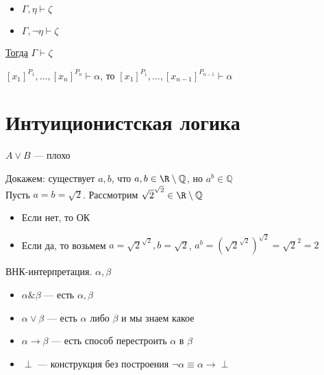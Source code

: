 \documentclass[english]{article}
\begin{document}
\begin{lemma}
	\-
	\begin{itemize}
		\item \(\Gamma, \eta \vdash \zeta\)
		\item \(\Gamma, \neg \eta \vdash \zeta\)
	\end{itemize}
	\uline{Тогда} \(\Gamma \vdash \zeta\)
	\label{orgef60dde}
\end{lemma}
\begin{lemma}
	\([x_1]^{P_1},\dots,[x_n]^{P_n} \vdash \alpha\), то \([x_1]^{P_1},\dots,[x_{n - 1}]^{P_{n- 1}} \vdash \alpha\)
	\label{org0080726}
\end{lemma}
\section{Интуиционистская логика}
\label{sec:orgd1fa5a3}
\(A \vee B\) --- плохо
\begin{examp}
	Докажем: существует \(a, b\), что \(a, b \in \R \setminus \mathbb{Q}\), но \(a^b \in \mathbb{Q}\) \\
	Пусть \(a = b = \sqrt{2}\). Рассмотрим \(\sqrt{2}^{\sqrt{2}} \in \R \setminus \mathbb{Q}\)
	\begin{itemize}
		\item Если нет, то ОК
		\item Если да, то возьмем \(a = \sqrt{2}^{\sqrt{2}}, b = \sqrt{2}\), \(a^b = (\sqrt{2}^{\sqrt{2}})^{\sqrt{2}} = \sqrt{2}^{2} = 2\)
	\end{itemize}
\end{examp}
\begin{defintion}
	ВНК-интерпретация. \(\alpha, \beta\)
	\begin{itemize}
		\item \(\alpha \& \beta\) --- есть \(\alpha, \beta\)
		\item \(\alpha \vee \beta\) --- есть \(\alpha\) либо \(\beta\) и мы знаем какое
		\item \(\alpha \to \beta\) --- есть способ перестроить \(\alpha\) в \(\beta\)
		\item \(\perp\) --- конструкция без построения \(\neg \alpha \equiv \alpha \to \perp\)
	\end{itemize}
\end{defintion}
\end{document}
